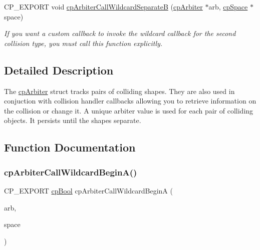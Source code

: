 \begin{DoxyCompactItemize}
\mbox{\label{group__cp_arbiter_gaf221f38af85d95f38ee9a15bcf15724a}} 
C\+P\+\_\+\+E\+X\+P\+O\+RT void \mbox{\hyperlink{group__cp_arbiter_gaf221f38af85d95f38ee9a15bcf15724a}{cp\+Arbiter\+Call\+Wildcard\+SeparateB}} (\mbox{\hyperlink{structcp_arbiter}{cp\+Arbiter}} $\ast$arb, \mbox{\hyperlink{structcp_space}{cp\+Space}} $\ast$space)
\begin{DoxyCompactList}\small\item\em If you want a custom callback to invoke the wildcard callback for the second collision type, you must call this function explicitly. \end{DoxyCompactList}\end{DoxyCompactItemize}


\subsection{Detailed Description}
The \mbox{\hyperlink{structcp_arbiter}{cp\+Arbiter}} struct tracks pairs of colliding shapes. They are also used in conjuction with collision handler callbacks allowing you to retrieve information on the collision or change it. A unique arbiter value is used for each pair of colliding objects. It persists until the shapes separate. 

\subsection{Function Documentation}
\mbox{\label{group__cp_arbiter_ga820d3549634a11d573eaa97923d59597}} 
\subsubsection{\texorpdfstring{cp\+Arbiter\+Call\+Wildcard\+Begin\+A()}{cpArbiterCallWildcardBeginA()}}
{\footnotesize\ttfamily C\+P\+\_\+\+E\+X\+P\+O\+RT \mbox{\hyperlink{group__basic_types_gabc5e752c48f3449ca26ef413ecbd647e}{cp\+Bool}} cp\+Arbiter\+Call\+Wildcard\+BeginA (\begin{DoxyParamCaption}\item[{\mbox{\hyperlink{structcp_arbiter}{cp\+Arbiter}} $\ast$}]{arb,  }\item[{\mbox{\hyperlink{structcp_space}{cp\+Space}} $\ast$}]{space }\end{DoxyParamCaption})}

